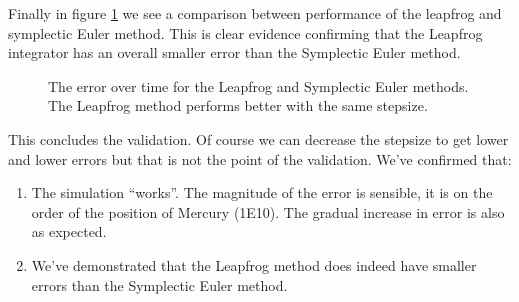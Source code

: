 \documentclass[a4paper]{article}
\begin{document}
Finally in figure \ref{fig:err_leap_sym} we see a comparison between performance of the leapfrog and
symplectic Euler method. This is clear evidence confirming that the Leapfrog integrator has an
overall smaller error than the Symplectic Euler method.
\begin{figure}
\caption{The error over time for the Leapfrog and Symplectic Euler methods. The Leapfrog method
  performs better with the same stepsize.}
\label{fig:err_leap_sym}
\end{figure}

This concludes the validation. Of course we can decrease the stepsize to get lower and lower errors
but that is not the point of the validation. We've confirmed that:
\begin{enumerate}
\item The simulation ``works''. The magnitude of the error is sensible, it is on the order of the
  position of Mercury (1E10). The gradual increase in error is also as expected.
\item We've demonstrated that the Leapfrog method does indeed have smaller errors than the
  Symplectic Euler method.
\end{enumerate}
\end{document}
